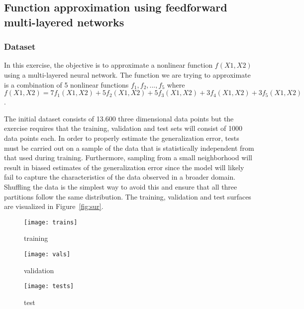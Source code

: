 \documentclass[conference,compsoc]{IEEEtran}
\begin{document}
\subsection{Function approximation using feedforward multi-layered networks}

\subsubsection{Dataset}
In this exercise, the objective is to approximate a nonlinear function $f(X1,X2)$ using a multi-layered neural network. The function we are trying to approximate is a combination of 5 nonlinear functions  $f_1, f_2,...,f_5$ where $f(X1,X2) = 7 f_1(X1, X2)+ 5 f_2(X1, X2) + 5 f_3(X1, X2) +3 f_4(X1, X2)+ 3 f_5(X1, X2)$.

The initial dataset consists of 13.600 three dimensional data points but the exercise requires that the training, validation and test sets will consist of 1000 data points each. In order to properly estimate the generalization error, tests must be carried out on a sample of the data that is statistically independent from that used during training. Furthermore, sampling from a small neighborhood will result in biased estimates of the generalization error since the model will likely fail to capture the characteristics of the data observed in a broader domain. Shuffling the data is the simplest way to avoid this and ensure that all three partitions follow the same distribution.
The training, validation and test surfaces are visualized in Figure~\ref{fig:sur}.


        \begin{figure*}[]
        \begin{subfigure}{0.33\linewidth}
            \texttt{[image: trains]}
            \caption{training}
        \end{subfigure}
        \begin{subfigure}{0.33\linewidth}
            \texttt{[image: vals]}
            \caption{validation}
        \end{subfigure}
        \begin{subfigure}{0.33\linewidth}
            \texttt{[image: tests]}
            \caption{test}
        \end{subfigure}
        \caption{Visualizing the personal regression surface}
        \label{fig:sur}
\end{figure*}
\end{document}
